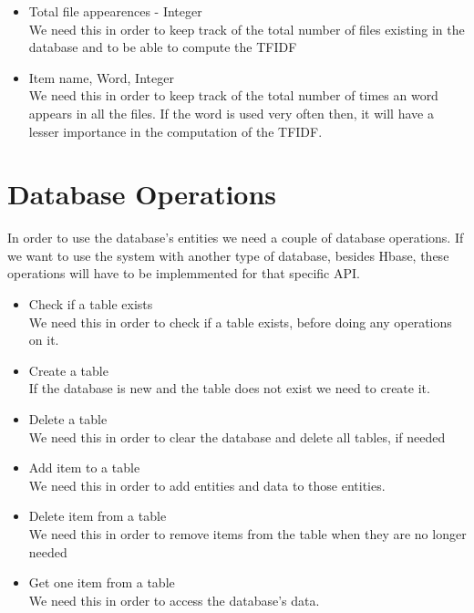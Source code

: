 \begin{itemize}
	\item Total file appearences - Integer
	\\ We need this in order to keep track of the total number of files existing in the database and to be able to compute the TFIDF
	\item Item name, Word, Integer
	\\ We need this in order to keep track of the total number of times an word appears in all the files.
	If the word is used very often then, it will have a lesser importance in the computation of the TFIDF.
\end{itemize}

\section{Database Operations}
\label{sec:database-operations}
In order to use the database's entities we need a couple of database operations.
If we want to use the system with another type of database, besides Hbase, these operations will have to be implemmented for that specific API.

\begin{itemize}
	\item Check if a table exists
	\\ We need this in order to check if a table exists, before doing any operations on it.
	\item Create a table
	\\ If the database is new and the table does not exist we need to create it.
	\item Delete a table
	\\ We need this in order to clear the database and delete all tables, if needed
	\item Add item to a table
	\\ We need this in order to add entities and data to those entities.
	\item Delete item from a table
	\\ We need this in order to remove items from the table when they are no longer needed
	\item Get one item from a table
	\\ We need this in order to access the database's data.
\end{itemize}

